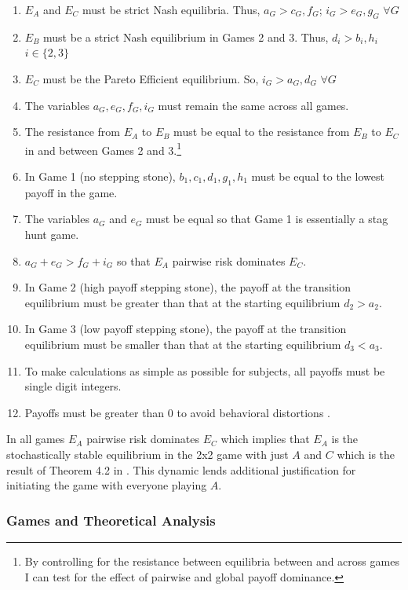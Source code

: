 \begin{enumerate}
    \item $E_A$ and $E_C$ must be strict Nash equilibria. Thus, $a_G > c_G, f_G$; $i_G > e_G, g_G$ $\forall G$
    \item $E_B$ must be a strict Nash equilibrium in Games 2 and 3. Thus, $d_i > b_i, h_i$ $i \in \{2, 3\}$
    \item $E_C$ must be the Pareto Efficient equilibrium. So, $i_G > a_G, d_G$ $\forall G$
    \item The variables $a_G, e_G, f_G, i_G$ must remain the same across all games.
    \item The resistance from $E_A$ to $E_B$ must be equal to the resistance from $E_B$ to $E_C$ in and between Games 2 and 3.\footnote{By controlling for the resistance between equilibria between and across games I can test for the effect of pairwise and global payoff dominance.}
    \item In Game 1 (no stepping stone), $b_1, c_1, d_1, g_1, h_1$ must be equal to the lowest payoff in the game.
    \item The variables $a_G$ and $e_G$ must be equal so that Game 1 is essentially a stag hunt game.
    \item $a_G+e_G > f_G+i_G$ so that $E_A$ pairwise risk dominates $E_C$.
    \item In Game 2 (high payoff stepping stone), the payoff at the transition equilibrium must be greater than that at the starting equilibrium $d_2 > a_2$.
    \item In Game 3 (low payoff stepping stone), the payoff at the transition equilibrium must be smaller than that at the starting equilibrium $d_3 < a_3$.
    \item To make calculations as simple as possible for subjects, all payoffs must be single digit integers.
    \item Payoffs must be greater than 0 to avoid behavioral distortions \citep{tversky1991loss, gneezy1997experiment}.
\end{enumerate}

 In all games $E_A$ pairwise risk dominates $E_C$ which implies that $E_A$ is the stochastically stable equilibrium in the 2x2 game with just $A$ and $C$ which is the result of Theorem 4.2 in \cite{Young1998}. This dynamic lends additional justification for initiating the game with everyone playing $A$. 

\subsubsection{Games and Theoretical Analysis}

